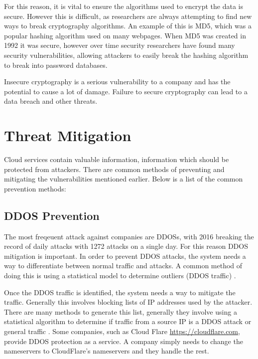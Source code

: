 For this reason, it is vital to ensure the algorithms used to encrypt the data is secure. However this is difficult, as researchers are always attempting to find new ways to break cryptography algorithms. An example of this is MD5, which was a popular hashing algorithm used on many webpages. When MD5 was created in 1992 it was secure, however over time security researchers have found many security vulnerabilities\cite{ora_data_2015}, allowing attackers to easily break the hashing algorithm to break into password databases.

Insecure cryptography is a serious vulnerability to a company and has the potential to cause a lot of damage. Failure to secure cryptography can lead to a data breach and other threats.

\section{Threat Mitigation}

Cloud services contain valuable information, information which should be protected from attackers. There are common methods of preventing and mitigating the vulnerabilities mentioned earlier. Below is a list of the common prevention methods:

\subsection{DDOS Prevention}

The most freqeuent attack against companies are DDOSs, with 2016 breaking the record of daily attacks with 1272 attacks on a single day\cite{kaspersky_kaspersky_2016}. For this reason DDOS mitigation is important. In order to prevent DDOS attacks, the system needs a way to differentiate between normal traffic and attacks. A common method of doing this is using a statistical model to determine outliers (DDOS traffic) \cite{hoque_botnet_2015}.

Once the DDOS traffic is identified, the system needs a way to mitigate the traffic. Generally this involves blocking lists of IP addresses used by the attacker. There are many methods to generate this list, generally they involve using a statistical algorithm to determine if traffic from a source IP is a DDOS attack or general traffic \cite{yu_can_2014}. 
Some companies, such as Cloud Flare \url{https://cloudflare.com}, provide DDOS protection as a service. A company simply needs to change the nameservers to CloudFlare's nameservers and they handle the rest.

